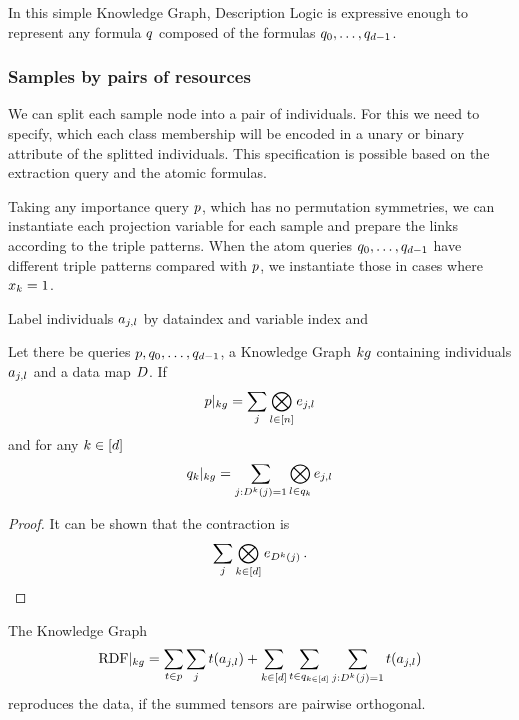 % 
In this simple Knowledge Graph, Description Logic is expressive enough to represent any formula $q$ composed of the formulas $q_{0},\ldots,q_{d-1}$.






\subsubsection{Samples by pairs of resources}




\begin{remark}
	We can split each sample node into a pair of individuals.
	For this we need to specify, which each class membership will be encoded in a unary or binary attribute of the splitted individuals.
	This specification is possible based on the extraction query and the atomic formulas.
\end{remark}

% 
Taking any importance query $p$, which has no permutation symmetries, we can instantiate each projection variable for each sample and prepare the links according to the triple patterns.
When the atom queries $q_{0},\ldots,q_{d-1}$ have different triple patterns compared with $p$, we instantiate those in cases where $x_{k}=1$.


%
Label individuals $a_{j,l}$ by dataindex and variable index and 

\begin{theorem}
	Let there be queries $p,q_{0},\ldots,q_{d-1}$, a Knowledge Graph $kg$ containing individuals $a_{j,l}$ and a data map $D$.
	If
		\[ {p}|_{kg} = \sum_{j} \bigotimes_{l\in[n]} e_{j,l} \]
	and for any $k\in[d]$
		\[ {q_{k}}|_{kg} 
		= \sum_{j : D^{k}(j)=1} \bigotimes_{l \in q_{k}} e_{j,l} \]
\end{theorem}
\begin{proof}
	It can be shown that the contraction is
		\[ \sum_{j} \bigotimes_{k\in[d]} e_{D^{k}(j)} \, . \]
\end{proof}

\begin{theorem}
	The Knowledge Graph
		\[ {\mathrm{RDF}}|_{kg} = \sum_{t \in p} \sum_{j} t(a_{j,l})
		+ \sum_{k\in[d]} \sum_{t \in q_{k\in[d]}} \sum_{j : D^{k}(j)=1} t(a_{j,l})\]
	reproduces the data, if the summed tensors are pairwise orthogonal.
\end{theorem}


